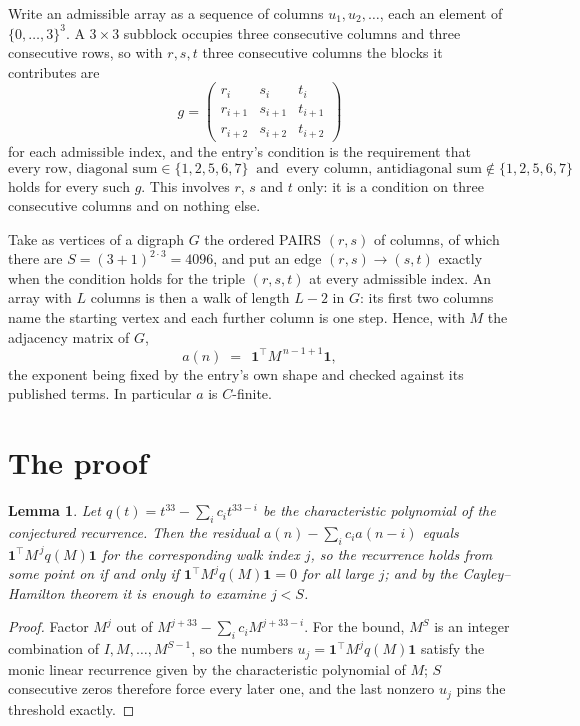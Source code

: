 \documentclass[11pt,a4paper]{article}
\theoremstyle{plain}
\newtheorem{lemma}[theorem]{Lemma}
\theoremstyle{definition}
\begin{document}
Write an admissible array as a sequence of columns $u_1,u_2,\dots$, each an element of
$\{0,\dots,3\}^{3}$. A $3\times3$ subblock occupies three consecutive columns and
three consecutive rows, so with $r,s,t$ three consecutive columns the blocks it
contributes are
\[
g=\begin{pmatrix}r_i&s_i&t_i\\ r_{i+1}&s_{i+1}&t_{i+1}\\ r_{i+2}&s_{i+2}&t_{i+2}\end{pmatrix}
\]
for each admissible index, and the entry's condition is the requirement that
\[
\text{every row, diagonal sum} \in \{1,2,5,6,7\}\ \text{ and }\ \text{every column, antidiagonal sum} \notin \{1,2,5,6,7\}
\]
holds for every such $g$. This involves $r$, $s$ and $t$ only: it is a condition on
three consecutive columns and on nothing else.

Take as vertices of a digraph $G$ the ordered PAIRS $(r,s)$ of columns, of which there are
$S=(3+1)^{2\cdot3}=4096$, and put an edge $(r,s)\to(s,t)$ exactly when the condition
holds for the triple $(r,s,t)$ at every admissible index. An array with $L$ columns is then a
walk of length $L-2$ in $G$: its first two columns name the starting vertex and each further
column is one step. Hence, with $M$ the adjacency matrix of $G$,
\[
a(n)\;=\;\,\mathbf{1}^{\!\top}M^{\,n-1+1}\mathbf{1},
\]
the exponent being fixed by the entry's own shape and checked against its published terms.
In particular $a$ is $C$-finite.

\section{The proof}

\begin{lemma}\label{lem:crit}
Let $q(t)=t^{33}-\sum_i c_it^{33-i}$ be the characteristic polynomial of the
conjectured recurrence. Then the residual $a(n)-\sum_ic_ia(n-i)$ equals
$\mathbf{1}^{\!\top}M^{\,j}q(M)\mathbf{1}$ for the corresponding walk index
$j$, so the recurrence holds from some point on if and only if
$\mathbf{1}^{\!\top}M^{j}q(M)\mathbf{1}=0$ for all large $j$; and by the
Cayley--Hamilton theorem it is enough to examine $j<S$.
\end{lemma}

\begin{proof}
Factor $M^{j}$ out of $M^{j+33}-\sum_ic_iM^{j+33-i}$. For the bound, $M^{S}$
is an integer combination of $I,M,\dots,M^{S-1}$, so the numbers
$u_j=\mathbf{1}^{\!\top}M^{j}q(M)\mathbf{1}$ satisfy the monic linear recurrence given by
the characteristic polynomial of $M$; $S$ consecutive zeros therefore force every later one,
and the last nonzero $u_j$ pins the threshold exactly.
\end{proof}
\end{document}
